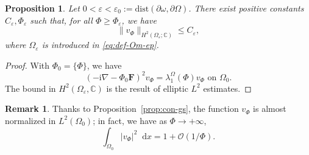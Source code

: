 \documentclass[11pt]{amsart}
\newcommand{\C}{\mathbb C}
\newcommand{\Fb}{\mathbf F}
\newcommand{\dd}{\mathop{}\!{\mathrm d}}
\newcommand{\ii}{\mathrm i}
\newtheorem{proposition}[theorem]{Proposition}
\theoremstyle{definition}
\newtheorem{remark}[theorem]{Remark}
\numberwithin{equation}{section}
\begin{document}
\begin{proposition}\label{prop:con-gs*}
Let $0<\varepsilon<\varepsilon_0:=\mathrm{dist}(\partial\omega,\partial\Omega)$.  There exist positive  constants $C_\varepsilon,\Phi_\varepsilon$ such that, for all $\Phi\geq \Phi_\varepsilon$, we have
\[\|v_\Phi\|_{H^2(\Omega_\varepsilon;\C)}\leq C_\varepsilon,\]
where $\Omega_\varepsilon$ is introduced in \eqref{eq:def-Om-ep}.
\end{proposition}
%
\begin{proof}
With $\Phi_0=\{\Phi\}$, we have
%
\[
(-\ii\nabla-\Phi_0\Fb)^2v_\Phi=\lambda_1^\Omega(\Phi)v_\Phi\text{ on }\Omega_0.
\]
The bound in $H^2(\Omega_\varepsilon,\C)$ is the result of elliptic $L^2$ estimates.
\end{proof}
%
\begin{remark}\label{rem:vb}
Thanks to Proposition~\ref{prop:con-gs}, the function $v_\Phi$ is almost normalized in $L^2(\Omega_0)$; in fact, we have as $\Phi\to+\infty$,
\[\int_{\Omega_0}|v_\Phi|^2\dd x=1+\mathcal O(1/\Phi). \]
\end{remark}
\end{document}
